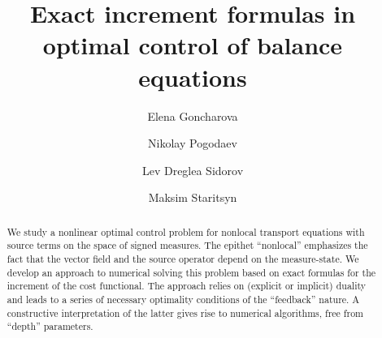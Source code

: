 \begin{englishtitle} %
\title{Exact increment formulas in optimal control of balance equations}
\author{ Elena Goncharova \and Nikolay Pogodaev \and Lev Dreglea Sidorov \and Maksim Staritsyn
}

\maketitle

\begin{abstract}
We study a nonlinear optimal control problem for nonlocal transport equations with source terms on the space of signed measures. The epithet ``nonlocal'' emphasizes the fact that the vector field and the source operator depend on the measure-state. We develop an approach to numerical solving  this problem based on exact formulas for the increment of the cost functional. The approach relies on (explicit or implicit) duality and leads to a series of necessary optimality conditions of the ``feedback'' nature. A constructive interpretation of the latter gives rise to numerical algorithms, free from ``depth'' parameters.

\end{abstract}
\end{englishtitle}

\iffalse
%
%


\documentclass[12pt]{llncs}  


\usepackage{iftex}



\ifPDFTeX
\usepackage[T2A]{fontenc}
\usepackage[utf8]{inputenc} %
\usepackage[english,russian]{babel}
\fi

\usepackage{todonotes} 

